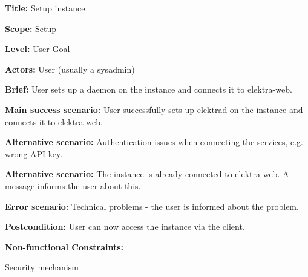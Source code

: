 
\begin{DoxyItemize}
\item {\bfseries{Title\+:}} Setup instance
\item {\bfseries{Scope\+:}} Setup
\item {\bfseries{Level\+:}} User Goal
\item {\bfseries{Actors\+:}} User (usually a sysadmin)
\item {\bfseries{Brief\+:}} User sets up a daemon on the instance and connects it to elektra-\/web.
\end{DoxyItemize}


\begin{DoxyItemize}
\item {\bfseries{Main success scenario\+:}} User successfully sets up elektrad on the instance and connects it to elektra-\/web.
\item {\bfseries{Alternative scenario\+:}} Authentication issues when connecting the services, e.\+g. wrong A\+PI key.
\item {\bfseries{Alternative scenario\+:}} The instance is already connected to elektra-\/web. A message informs the user about this.
\item {\bfseries{Error scenario\+:}} Technical problems -\/ the user is informed about the problem.
\item {\bfseries{Postcondition\+:}} User can now access the instance via the client.
\item {\bfseries{Non-\/functional Constraints\+:}}
\begin{DoxyItemize}
\item Security mechanism 
\end{DoxyItemize}
\end{DoxyItemize}